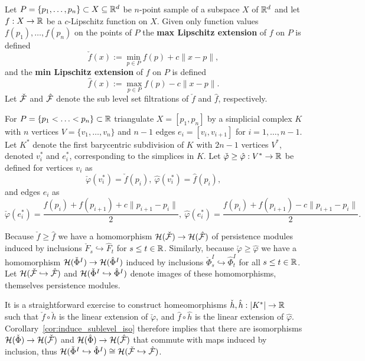 
Let $P = \{p_1,\ldots, p_n\}\subset X\subseteq \mathbb{R}^d$ be $n$-point sample of a subspace $X$ of $\mathbb{R}^d$ and let $f : X\to \mathbb{R}$ be a $c$-Lipschitz function on $X$.
Given only function values $f(p_1),\ldots, f(p_n)$ on the points of $P$ the \textbf{max Lipschitz extension} of $f$ on $P$ is defined
\[ \check{f}(x) := \min_{p\in P} f(p) + c\| x - p\|,\]
and the \textbf{min Lipschitz extension} of $f$ on $P$ is defined
\[ \hat{f}(x) := \max_{p\in P} f(p) - c\| x - p\|.\]
Let $\check{\mathcal{F}}$ and $\hat{\mathcal{F}}$ denote the sub level set filtrations of $\check{f}$ and $\hat{f}$, respectively.

For $P = \{p_1 < \ldots < p_n\}\subset\mathbb{R}$ triangulate $X = [p_1, p_n]$ by a simplicial complex $K$ with $n$ vertices $V=\{v_1,\ldots, v_n\}$ and $n-1$ edges $e_i = [v_i, v_{i+1}]$ for $i=1,\ldots, n-1$.
Let $K^*$ denote the first barycentric subdivision of $K$ with $2n-1$ vertices $V^*$, denoted $v_i^*$ and $e_i^*$, corresponding to the simplices in $K$.
Let $\check{\varphi}\geq\hat{\varphi} : V^*\to\mathbb{R}$ be defined for vertices $v_i$ as
\[ \check{\varphi}(v_i^*) = \check{f}(p_i),\ \hat{\varphi}(v_i^*) = \hat{f}(p_i),\]
and edges $e_i$ as
\[ \check{\varphi}(e_i^*) = \frac{f(p_i) + f(p_{i+1}) + c\|p_{i+1} - p_i\|}{2},\ \hat{\varphi}(e_i^*) = \frac{f(p_i) + f(p_{i+1}) - c\|p_{i+1} - p_i\|}{2}.\]

Because $\check{f}\geq \hat{f}$ we have a homomorphism $\mathcal{H}(\check{\mathcal{F}})\to\mathcal{H}(\hat{\mathcal{F}})$ of persistence modules induced by inclusions $\check{F}_s\hookrightarrow \hat{F}_t$ for $s\leq t\in\mathbb{R}$.
Similarly, because $\check{\varphi}\geq\hat{\varphi}$ we have a homomorphism $\mathcal{H}(\check{\Phi}^I)\to\mathcal{H}(\hat{\Phi}^I)$ induced by inclusions $\check{\Phi}_s^I\hookrightarrow\hat{\Phi}_t^I$ for all $s\leq t\in\mathbb{R}$.
Let $\mathcal{H}(\check{\mathcal{F}}\hookrightarrow \hat{\mathcal{F}})$ and $\mathcal{H}(\check{\Phi}^I\hookrightarrow \hat{\Phi}^I)$ denote images of these homomorphisms, themselves persistence modules.

It is a straightforward exercise to construct homeomorphisms $\check{h},\hat{h} : |K^*|\to \mathbb{R}$ such that $\check{f}\circ\check{h}$ is the linear extension of $\check{\varphi}$, and $\hat{f}\circ\hat{h}$ is the linear extension of $\hat{\varphi}$.
Corollary~\ref{cor:induce_sublevel_iso} therefore implies that there are isomorphisms $\mathcal{H}(\check{\Phi})\to \mathcal{H}(\check{\mathcal{F}})$ and $\mathcal{H}(\hat{\Phi})\to \mathcal{H}(\hat{\mathcal{F}})$ that commute with maps induced by inclusion, thus $\mathcal{H}(\check{\Phi}^I\hookrightarrow \hat{\Phi}^I)\cong \mathcal{H}(\check{\mathcal{F}}\hookrightarrow \hat{\mathcal{F}})$.
